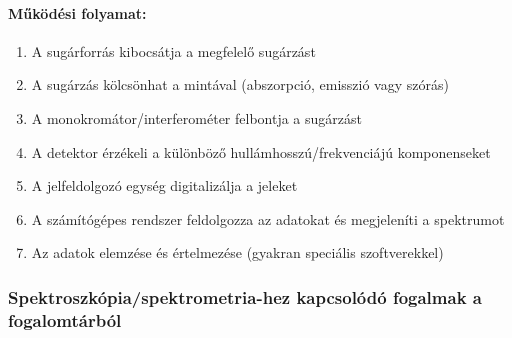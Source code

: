 \documentclass[a4paper,12pt]{article}
\begin{document}
\paragraph{Működési folyamat:} \begin{enumerate} \item A sugárforrás kibocsátja a megfelelő sugárzást \item A sugárzás kölcsönhat a mintával (abszorpció, emisszió vagy szórás) \item A monokromátor/interferométer felbontja a sugárzást \item A detektor érzékeli a különböző hullámhosszú/frekvenciájú komponenseket \item A jelfeldolgozó egység digitalizálja a jeleket \item A számítógépes rendszer feldolgozza az adatokat és megjeleníti a spektrumot \item Az adatok elemzése és értelmezése (gyakran speciális szoftverekkel) \end{enumerate}

\subsubsection{Spektroszkópia/spektrometria-hez kapcsolódó fogalmak a fogalomtárból} 
\end{document}
